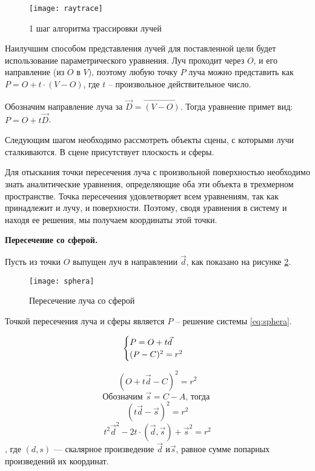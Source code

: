 \begin{figure}[H]
	\centering
	\texttt{[image: raytrace]}
	\caption{1 шаг алгоритма трассировки лучей}
	\label{img:raytrace}
\end{figure}

Наилучшим способом представления лучей для поставленной цели будет использование параметрического уравнения. Луч проходит через $O$, и его направление (из $O$ в $V$), поэтому любую точку $P$ луча можно представить как $P = O + t \cdot (V - O)$, где $t$ -- произвольное действительное число. 

Обозначим направление луча за $\vec D = \overrightarrow{(V - O) }$. Тогда уравнение примет вид: $P = O + t\vec D$. 

Следующим шагом необходимо рассмотреть объекты сцены, с которыми лучи сталкиваются. В сцене присутствует плоскость и сферы.

Для отыскания точки пересечения луча с произвольной поверхностью необходимо знать аналитические уравнения, определяющие оба эти объекта в трехмерном пространстве. Точка пересечения удовлетворяет всем уравнениям, так как принадлежит и лучу, и поверхности. Поэтому, сводя уравнения в систему и находя ее решения, мы получаем координаты этой точки. 

\textbf{Пересечение со сферой. }

Пусть из точки $O$ выпущен луч в направлении $\vec d$, как показано на рисунке \ref{img:sphera}. 

\begin{figure}[H]
	\centering
	\texttt{[image: sphera]}
	\caption{Пересечение луча со сферой}
	\label{img:sphera}
\end{figure}

Точкой пересечения луча и сферы является $P$ -- решение системы  \ref{eq:sphera}. 

\begin{equation}
	\centering
	\begin{cases}
   		P = O + t\vec d\\
   		(P-C)^2 = r^2
 	\end{cases}
	\label{eq:sphera}
\end{equation}

$$(O + t\vec d - C) ^ 2 = r^2$$
$$\text{Обозначим }\vec s = C - A  \text{, тогда }$$
$$(t\vec d -\vec s)^2 = r^2$$
$$t^2 \vec d^2  - 2  t \cdot (\vec d, \vec s) + \vec s ^2 = r^2$$, где $(d,s)$ — скалярное произведение $\vec d $ и$ \vec s$, равное сумме попарных произведений их координат.

